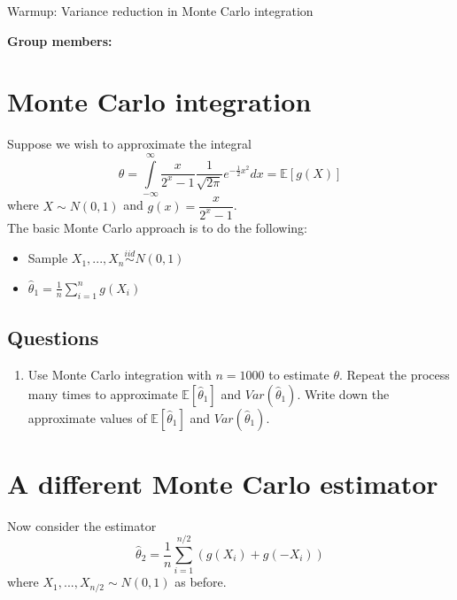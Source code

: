 \documentclass[12pt]{article}
\begin{document}
\begin{center}
\Large
Warmup: Variance reduction in Monte Carlo integration \\
\normalsize
\vspace{5mm}
\end{center}

\noindent \textbf{Group members:}

\section*{Monte Carlo integration}

Suppose we wish to approximate the integral
$$\theta = \int \limits_{-\infty}^\infty \frac{x}{2^x - 1} \frac{1}{\sqrt{2\pi}}e^{-\frac{1}{2}x^2} dx = \mathbb{E}[g(X)]$$
where $X \sim N(0, 1)$ and $g(x) = \dfrac{x}{2^x - 1}$.\\

\noindent The basic Monte Carlo approach is to do the following:

\begin{itemize}
\item Sample $X_1,...,X_n \overset{iid}{\sim} N(0, 1)$
\item $\widehat{\theta}_1 = \frac{1}{n} \sum \limits_{i=1}^n g(X_i)$
\end{itemize}

\subsection*{Questions}

\begin{enumerate}
\item Use Monte Carlo integration with $n = 1000$ to estimate $\theta$. Repeat the process many times to approximate $\mathbb{E}[\widehat{\theta}_1]$ and $Var(\widehat{\theta}_1)$. Write down the approximate values of $\mathbb{E}[\widehat{\theta}_1]$ and $Var(\widehat{\theta}_1)$.

\end{enumerate}

\vspace{4cm}

\section*{A different Monte Carlo estimator}

Now consider the estimator
$$\widehat{\theta}_2 = \frac{1}{n} \sum \limits_{i=1}^{n/2} (g(X_i) + g(-X_i))$$
where $X_1,...,X_{n/2} \sim N(0, 1)$ as before.
\end{document}
